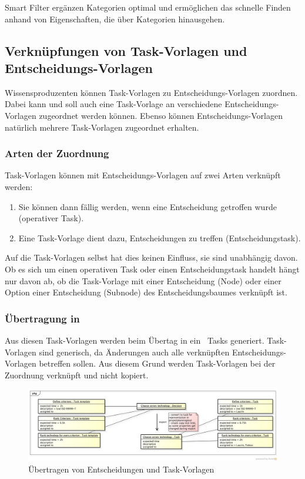 {{				Smart Filter ergänzen Kategorien optimal und ermöglichen das schnelle Finden anhand von Eigenschaften,
				die über Kategorien hinausgehen.
			}
			{}
			{}
			{}
		}
		
		
		\subsection{Verknüpfungen von Task-Vorlagen und Entscheidungs-Vorlagen}
			Wissensproduzenten können Task-Vorlagen zu Entscheidungs-Vorlagen zuordnen.
			Dabei kann und soll auch eine Task-Vorlage an verschiedene Entscheidungs-Vorlagen zugeordnet werden können.
			Ebenso können Entscheidungs-Vorlagen natürlich mehrere Task-Vorlagen zugeordnet erhalten.
			
			\subsubsection{Arten der Zuordnung}
				Task-Vorlagen können mit Entscheidungs-Vorlagen auf zwei Arten verknüpft werden:
				\begin{enumerate}
					\item Sie können dann fällig werden, wenn eine Entscheidung getroffen wurde (operativer Task).
					\item Eine Task-Vorlage dient dazu, Entscheidungen zu treffen (Entscheidungstask).
				\end{enumerate}
				Auf die Task-Vorlagen selbst hat dies keinen Einfluss, sie sind unabhängig davon. 
				Ob es sich um einen operativen Task oder einen Entscheidungstask handelt hängt nur davon ab,
				ob die Task-Vorlage mit einer Entscheidung (Node) oder einer Option einer Entscheidung (Subnode) des Entscheidungsbaumes verknüpft ist.

			\subsubsection{Übertragung in \ppt}
				Aus diesen Task-Vorlagen werden beim Übertag in ein \ppt\ Tasks generiert.
				Task-Vorlagen sind generisch, da Änderungen auch alle verknüpften Entscheidungs-Vorlagen betreffen sollen.
				Aus diesem Grund werden Task-Vorlagen bei der Zuordnung verknüpft und nicht kopiert.
				
				\begin{figure}[H]
					\includegraphics[width=\textwidth]{architecture/media/img/DecisionTaskRelation.jpg}
					\centering
					\caption{Übertragen von Entscheidungen und Task-Vorlagen}
					\label{fig:DecisionTaskRelation}
				\end{figure}
				
